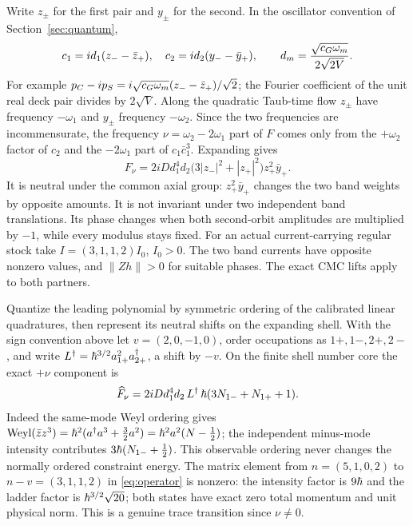 Write \(z_\pm\) for the first pair and \(y_\pm\) for the second. In the oscillator convention of Section~\ref{sec:quantum},
\[
    c_1=i d_1(z_- -\bar z_+),\quad
    c_2=i d_2(y_--\bar y_+),\qquad
    d_m=\frac{\sqrt{c_G\omega_m}}{2\sqrt{2V}}.
\]
For example \(p_C-ip_S=i\sqrt{c_G\omega_m}(z_--\bar z_+)/\sqrt2\); the Fourier coefficient of the unit real deck pair divides by \(2\sqrt V\). Along the quadratic Taub-time flow \(z_\pm\) have frequency \(-\omega_1\) and \(y_\pm\) frequency \(-\omega_2\). Since the two frequencies are incommensurate, the frequency
\(\nu=\omega_2-2\omega_1\) part of \(F\) comes only from the \(+\omega_2\) factor of \(c_2\) and the \(-2\omega_1\) part of \(c_1\bar c_1^3\). Expanding gives
\begin{equation}\label{eq:Fnu}
     F_\nu=2iD d_1^4d_2\bigl(3|z_-|^2+|z_+|^2\bigr)
                                   z_+^2\bar y_+ .
\end{equation}
It is neutral under the common axial group: \(z_+^2\bar y_+\) changes the two band weights by opposite amounts. It is not invariant under two independent band translations. Its phase changes when both second-orbit amplitudes are multiplied by \(-1\), while every modulus stays fixed. For an actual current-carrying regular stock take \(I=(3,1,1,2) I_0\), \(I_0>0\). The two band currents have opposite nonzero values, and \(\|Zh\|>0\) for suitable phases. The exact CMC lifts apply to both partners.

Quantize the leading polynomial by symmetric ordering of the calibrated linear quadratures, then represent its neutral shifts on the expanding shell. With the sign convention above let \(v=(2,0,-1,0)\), order occupations as \(1+,1-,2+,2-\), and write
\(L^\dagger=\hbar^{3/2} a_{1+}^2 a_{2+}^\dagger\), a shift by \(-v\). On the finite shell number core the exact \(+\nu\) component is
\begin{equation}\label{eq:operator}
   \widehat F_\nu
     =2iD d_1^4 d_2\,L^\dagger\,\hbar(3N_{1-}+N_{1+}+1).
\end{equation}
Indeed the same-mode Weyl ordering gives
\(\mathrm{Weyl}(\bar z z^3)=\hbar^2(a^\dagger a^3+\tfrac32 a^2)
=\hbar^2 a^2(N-\tfrac12)\); the independent minus-mode intensity contributes \(3\hbar(N_{1-}+\tfrac12)\). This observable ordering never changes the normally ordered constraint energy. The matrix element from \(n=(5,1,0,2)\) to \(n-v=(3,1,1,2)\) in \eqref{eq:operator} is nonzero: the intensity factor is \(9\hbar\) and the ladder factor is \(\hbar^{3/2}\sqrt{20}\); both states have exact zero total momentum and unit physical norm. This is a genuine trace transition since \(\nu\ne0\).


